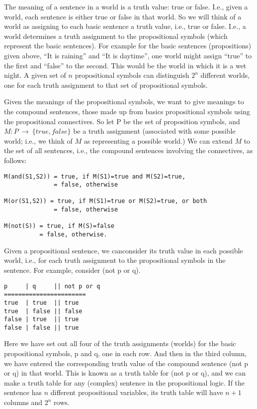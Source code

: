 The meaning of a sentence in a world is a truth value: true or false.
I.e., given a world, each sentence is either true or false in that
world.  So we will think of a world as assigning to each basic
sentence a truth value, i.e., true or false.  I.e., a world determines
a truth assignment to the propositional symbols (which represent the
basic sentences).  For example for the basic sentences (propositions)
given above, ``It is raining'' and ``It is daytime'', one world might
assign ``true'' to the first and ``false'' to the second.  This would
be the world in which it is a wet night.  A given set of $n$
propositional symbols can distinguish $2^n$ different worlds, one for
each truth assignment to that set of propositional symbols.

Given the meanings of the propositional symbols, we want to give
meanings to the compound sentences, those made up from basics
propositional symbols using the propositional connectives.  So let P
be the set of proposition symbols, and $M:P~ \rightarrow
~\{true,false\}$ be a truth assignment (associated with some possible
world; i.e., we think of $M$ as representing a possible world.)  We
can extend $M$ to the set of all sentences, i.e., the compound
sentences involving the connectives, as follows:

\begin{verbatim}
M(and(S1,S2)) = true, if M(S1)=true and M(S2)=true,
              = false, otherwise

M(or(S1,S2)) = true, if M(S1)=true or M(S2)=true, or both
              = false, otherwise

M(not(S)) = true, if M(S)=false
          = false, otherwise.
\end{verbatim}

Given a propositional sentence, we canconsider its truth value in each
possible world, i.e., for each truth assignment to the propositional
symbols in the sentence.  For example, consider (not p or q).

\begin{verbatim}
p     | q     || not p or q
=======================
true  | true  || true
true  | false || false
false | true  || true
false | false || true
\end{verbatim}

Here we have set out all four of the truth assignments (worlds) for
the basic propositional symbols, p and q, one in each row.  And then
in the third column, we have entered the corresponding truth value of
the compound sentence (not p or q) in that world.
This is known as a truth table for (not p or q), and we can make a
truth table for any (complex) sentence in the propositional logic.  If
the sentence has $n$ different propositional variables, its truth
table will have $n+1$ columns and $2^n$ rows.


